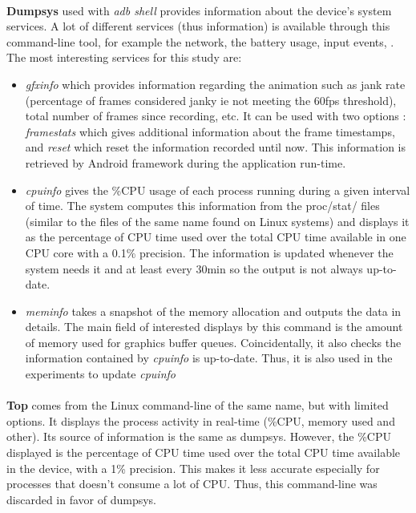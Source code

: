 \paragraph{}
\textbf{Dumpsys} \cite{dumpsys} used with \textit{adb shell} provides information about the device's system services. A lot of different services (thus information) is available through this command-line tool, for example the network, the battery usage, input events, . The most interesting services for this study are:  
\begin{itemize}
    \item \textit{gfxinfo} which provides information regarding the animation such as jank rate (percentage of frames considered janky ie not meeting the 60fps threshold), total number of frames since recording, etc. It can be used with two options : \textit{framestats} which gives additional information about the frame timestamps, and \textit{reset} which reset the information recorded until now. This information is retrieved by Android framework during the application run-time.
    
    \item \textit{cpuinfo} gives the \%CPU usage of each process running during a given interval of time. The system computes this information from the proc/stat/ files (similar to the files of the same name found on Linux systems) and displays it as the percentage of CPU time used over the total CPU time available in one CPU core with a 0.1\% precision. The information is updated whenever the system needs it and    at least every 30min so the output is not always up-to-date.  
    
    \item \textit{meminfo} takes a snapshot of the memory allocation and outputs the data in details. The main field of interested displays by this command is the amount of memory used for graphics buffer queues. Coincidentally, it also checks the information contained by \textit{cpuinfo} is up-to-date. Thus, it is also used in the experiments to update \textit{cpuinfo}
\end{itemize}

\paragraph{}
\textbf{Top} comes from the Linux command-line of the same name, but with limited options. It displays the process activity in real-time (\%CPU, memory used and other). Its source of information is the same as dumpsys. However, the \%CPU displayed is the percentage of CPU time used over the total CPU time available in the device, with a 1\% precision. This makes it less accurate especially for processes that doesn't consume a lot of CPU. Thus, this command-line was discarded in favor of dumpsys.

